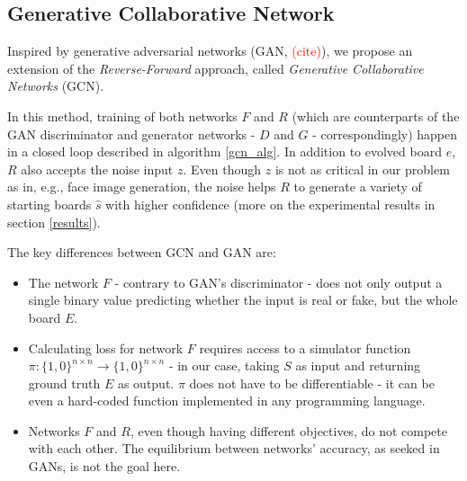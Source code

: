 \documentclass[conference]{IEEEtran}
\newcommand\todo[1]{\textcolor{red}{#1}}
\begin{document}
\subsection{Generative Collaborative Network}
\label{gcn}
Inspired by generative adversarial networks (GAN, \todo{(cite)}), we propose an extension of the \emph{Reverse-Forward} approach, called \emph{Generative Collaborative Networks} (GCN).


In this method, training of both networks $F$ and $R$ (which are counterparts of the GAN discriminator and generator networks - $D$ and $G$ - correspondingly) happen in a closed loop described in algorithm \ref{gcn_alg}. In addition to evolved board $e$, $R$ also accepts the noise input $z$. Even though $z$ is not as critical in our problem as in, e.g., face image generation, the noise helps $R$ to generate a variety of starting boards $\hat s$ with higher confidence (more on the experimental results in section \ref{results}). 

The key differences between GCN and GAN are:
\begin{itemize}
    \item The network $F$ - contrary to GAN's discriminator - does not only output a single binary value predicting whether the input is real or fake, but the whole board $E$.
    \item Calculating loss for network $F$ requires access to a simulator function $\pi : \{1,0\}^{n\times n} \rightarrow \{1,0\}^{n\times n}$ - in our case, taking $S$ as input and returning ground truth $E$ as output. $\pi$ does not have to be differentiable - it can be even a hard-coded function implemented in any programming language.
    \item Networks $F$ and $R$, even though having different objectives, do not compete with each other. The equilibrium between networks' accuracy, as seeked in GANs, is not the goal here.
\end{itemize}
\end{document}
